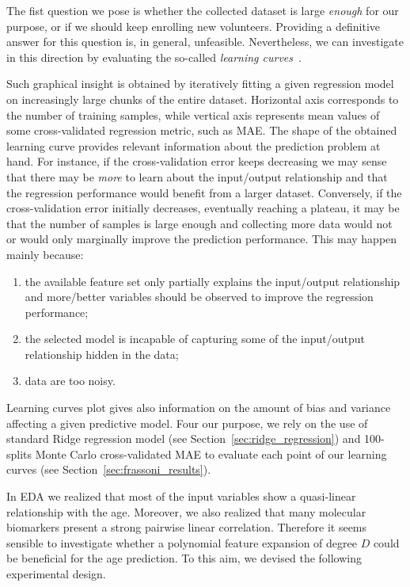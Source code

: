 The fist question we pose is whether the collected dataset is large \textit{enough} for our purpose, or if we should keep enrolling new volunteers. Providing a definitive answer for this question is, in general, unfeasible. Nevertheless, we can investigate in this direction by evaluating the so-called \textit{learning curves}~\cite{murphy2012machine}.

Such graphical insight is obtained by iteratively fitting a given regression model on increasingly large chunks of the entire dataset.
Horizontal axis corresponds to the number of training samples, while vertical axis represents mean values of some cross-validated regression metric, such as MAE.
The shape of the obtained learning curve provides relevant information about the prediction problem at hand. For instance, if the cross-validation error keeps decreasing we may sense that there may be \textit{more} to learn about the input/output relationship and that the regression performance would benefit from a larger dataset. Conversely, if the cross-validation error initially decreases, eventually reaching a plateau, it may be that the number of samples is large enough and collecting more data would not or would only marginally improve the prediction performance. This may happen mainly because:
\begin{enumerate}
	\item the available feature set only partially explains the input/output relationship and more/better variables should be observed to improve the regression performance;
	\item the selected model is incapable of capturing some of the input/output relationship  hidden in the data;
	\item data are too noisy.
\end{enumerate}
Learning curves plot gives also information on the amount of bias and variance affecting a given predictive model.
Four our purpose, we rely on the use of standard Ridge regression model (see Section~\ref{sec:ridge_regression}) and 100-splits Monte Carlo cross-validated MAE to evaluate each point of our learning curves (see Section~\ref{sec:frassoni_results}).

In EDA we realized that most of the input variables show a quasi-linear relationship with the age. Moreover, we also realized that many molecular biomarkers present a strong pairwise linear correlation. Therefore it seems sensible to investigate whether a polynomial feature expansion of degree $D$ could be beneficial for the age prediction.
To this aim, we devised the following experimental design.

